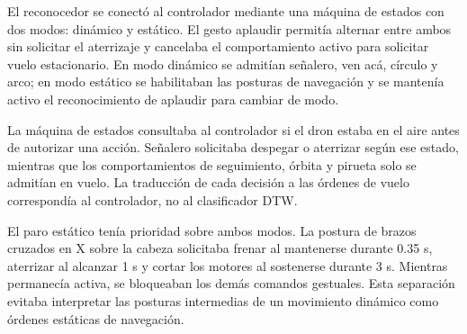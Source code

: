 El reconocedor se conectó al controlador mediante una máquina de estados con dos modos: dinámico y estático. El gesto aplaudir permitía alternar entre ambos sin solicitar el aterrizaje y cancelaba el comportamiento activo para solicitar vuelo estacionario. En modo dinámico se admitían señalero, ven acá, círculo y arco; en modo estático se habilitaban las posturas de navegación y se mantenía activo el reconocimiento de aplaudir para cambiar de modo.

La máquina de estados consultaba al controlador si el dron estaba en el aire antes de autorizar una acción. Señalero solicitaba despegar o aterrizar según ese estado, mientras que los comportamientos de seguimiento, órbita y pirueta solo se admitían en vuelo. La traducción de cada decisión a las órdenes de vuelo correspondía al controlador, no al clasificador DTW.

El paro estático tenía prioridad sobre ambos modos. La postura de brazos cruzados en X sobre la cabeza solicitaba frenar al mantenerse durante 0.35 s, aterrizar al alcanzar 1 s y cortar los motores al sostenerse durante 3 s. Mientras permanecía activa, se bloqueaban los demás comandos gestuales. Esta separación evitaba interpretar las posturas intermedias de un movimiento dinámico como órdenes estáticas de navegación.
